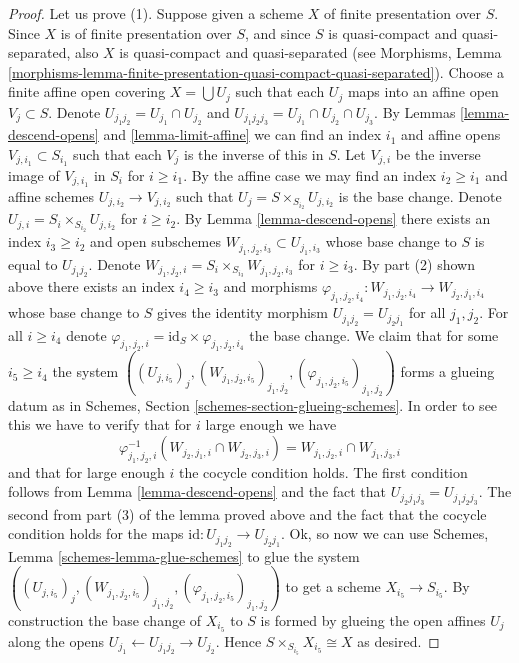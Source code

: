 \begin{proof}
\medskip\noindent
Let us prove (1). Suppose given a scheme $X$ of finite presentation
over $S$. Since $X$ is of finite presentation
over $S$, and since $S$ is quasi-compact and quasi-separated, also
$X$ is quasi-compact and quasi-separated
(see Morphisms,
Lemma \ref{morphisms-lemma-finite-presentation-quasi-compact-quasi-separated}).
Choose a finite affine open covering $X = \bigcup U_j$
such that each $U_j$ maps into an affine open $V_j \subset S$.
Denote $U_{j_1j_2} = U_{j_1} \cap U_{j_2}$ and
$U_{j_1j_2j_3} = U_{j_1} \cap U_{j_2} \cap U_{j_3}$.
By Lemmas \ref{lemma-descend-opens} and \ref{lemma-limit-affine}
we can find an index $i_1$ and affine opens $V_{j, i_1} \subset S_{i_1}$
such that each $V_j$ is the inverse of this in $S$.
Let $V_{j, i}$ be the inverse image of $V_{j, i_1}$ in $S_i$ for
$i \geq i_1$. By the affine case we may find an index $i_2 \geq i_1$ and
affine schemes $U_{j, i_2} \to V_{j, i_2}$ such
that $U_j = S \times_{S_{i_2}} U_{j, i_2}$ is the base change.
Denote $U_{j, i} = S_i \times_{S_{i_2}} U_{j, i_2}$ for $i \geq i_2$.
By Lemma \ref{lemma-descend-opens} there exists an index
$i_3 \geq i_2$ and open subschemes
$W_{j_1, j_2, i_3} \subset U_{j_1, i_3}$
whose base change to $S$ is equal to $U_{j_1j_2}$.
Denote $W_{j_1, j_2, i} = S_i \times_{S_{i_3}} W_{j_1, j_2, i_3}$
for $i \geq i_3$. By part (2) shown above there exists an index
$i_4 \geq i_3$ and morphisms
$\varphi_{j_1, j_2, i_4} : W_{j_1, j_2, i_4} \to W_{j_2, j_1, i_4}$
whose base change to $S$ gives the identity morphism
$U_{j_1j_2} = U_{j_2j_1}$ for all $j_1, j_2$.
For all $i \geq i_4$ denote
$\varphi_{j_1, j_2, i} = \text{id}_S \times \varphi_{j_1, j_2, i_4}$
the base change. We claim that for some $i_5 \geq i_4$ the system
$((U_{j, i_5})_j, (W_{j_1, j_2, i_5})_{j_1, j_2},
(\varphi_{j_1, j_2, i_5})_{j_1, j_2})$ forms a glueing datum
as in Schemes, Section \ref{schemes-section-glueing-schemes}.
In order to see this we have to verify that for $i$ large enough
we have
$$
\varphi_{j_1, j_2, i}^{-1}(W_{j_2, j_1, i} \cap W_{j_2, j_3, i})
=
W_{j_1, j_2, i} \cap W_{j_1, j_3, i}
$$
and that for large enough $i$ the cocycle condition holds.
The first condition follows from Lemma \ref{lemma-descend-opens}
and the fact that $U_{j_2j_1j_3} = U_{j_1j_2j_3}$.
The second from part (3) of the lemma proved above and the fact
that the cocycle condition holds for the maps
$\text{id} : U_{j_1j_2} \to U_{j_2j_1}$.
Ok, so now we can use Schemes, Lemma \ref{schemes-lemma-glue-schemes}
to glue the system
$((U_{j, i_5})_j, (W_{j_1, j_2, i_5})_{j_1, j_2},
(\varphi_{j_1, j_2, i_5})_{j_1, j_2})$ to get a scheme
$X_{i_5} \to S_{i_5}$. By construction the base change of
$X_{i_5}$ to $S$ is formed by glueing the open affines
$U_j$ along the opens $U_{j_1} \leftarrow U_{j_1j_2} \rightarrow U_{j_2}$.
Hence $S \times_{S_{i_5}} X_{i_5} \cong X$ as desired.
\end{proof}

